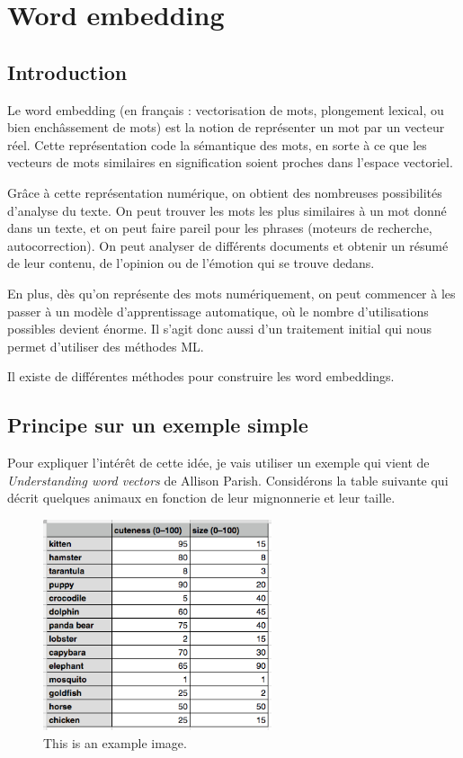 \documentclass[11pt, a4paper]{report}
\begin{document}
\chapter{Word embedding}
  \section{Introduction}
  Le word embedding (en français : vectorisation de mots, plongement lexical, ou bien enchâssement de mots)
est la notion de représenter un mot par un vecteur réel. Cette représentation code la sémantique
des mots, en sorte à ce que les vecteurs de mots similaires en signification soient proches 
dans l'espace vectoriel. 

Grâce à cette représentation numérique, on obtient des nombreuses 
possibilités d'analyse du texte. On peut trouver les mots les plus similaires à un mot donné 
dans un texte, et on peut faire pareil pour les phrases (moteurs de recherche, autocorrection). 
On peut analyser de différents documents et obtenir un résumé de leur contenu, de l'opinion 
ou de l'émotion qui se trouve dedans. 

En plus, dès qu'on représente des mots numériquement, on peut commencer à les passer à un 
modèle d'apprentissage automatique, où le nombre d'utilisations possibles devient 
énorme. Il s'agit donc aussi d'un traitement initial qui nous permet 
d'utiliser des méthodes ML.

Il existe de différentes méthodes pour construire les word embeddings. 







  \section{Principe sur un exemple simple}

Pour expliquer l'intérêt de cette idée, je vais utiliser un exemple qui vient de 
\textit{Understanding word vectors} de Allison Parish. Considérons la table suivante qui décrit quelques 
animaux en fonction de leur mignonnerie et leur taille. 

\begin{figure}[h]
  \centering
  \includegraphics[width=0.6\textwidth]{animal-table.png}
  \caption{This is an example image.}
  \label{fig:example}
\end{figure}
\end{document}
